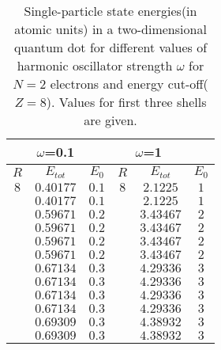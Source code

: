 \documentclass[10pt]{article}
\begin{document}
\begin{table}[h!]
  \caption{ Single-particle state energies(in atomic units) in a two-dimensional quantum dot for different values of harmonic oscillator strength $\omega$ for $N=2$ electrons and energy cut-off($Z=8$). Values for first three shells are given.}
  \label{tab:results1}
  \begin{center}
    \begin{tabular}{ccc|ccc}
     \multirow{2}{*}{} &
      \multicolumn{1}{c}{$\omega$=0.1} &
      \multicolumn{4}{c}{$\omega$=1} \\
    \hline
    \hline
		$R$ & $E_{tot}$ & $E_0$ & $R$ & $E_{tot}$ & $E_0$  \\
    \hline
	   $	8 $  & $0.40177 $ & $  0.1$ &$	8 $  & $2.1225  $ & $  1$  \\
	   $	  $  & $0.40177 $ & $  0.1$ &$	  $  & $2.1225  $ & $  1$  \\
	   $	  $  & $0.59671 $ & $  0.2$ &$	  $  & $3.43467 $ & $  2$  \\
	   $	  $  & $0.59671 $ & $  0.2$ &$	  $  & $3.43467 $ & $  2$  \\
   	   $	  $  & $0.59671 $ & $  0.2$ &$	  $  & $3.43467 $ & $  2$  \\
   	   $	  $  & $0.59671 $ & $  0.2$ &$	  $  & $3.43467 $ & $  2$  \\
       $      $  & $0.67134 $ & $  0.3$ &$    $  & $4.29336 $ & $  3$  \\
       $      $  & $0.67134 $ & $  0.3$ &$    $  & $4.29336 $ & $  3$  \\
       $      $  & $0.67134 $ & $  0.3$ &$    $  & $4.29336 $ & $  3$  \\
       $      $  & $0.67134 $ & $  0.3$ &$    $  & $4.29336 $ & $  3$  \\
				 & $0.69309 $ & $  0.3$ &        & $4.38932 $ & $  3$  \\
				 & $0.69309 $ & $  0.3$ &        & $4.38932 $ & $  3$  \\
	\end{tabular}                                                                                  
  \end{center}
\end{table}
\end{document}
